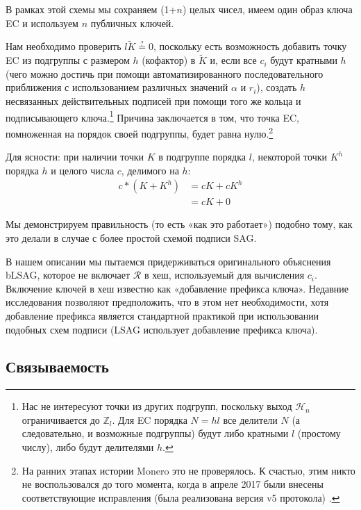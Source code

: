 В рамках этой схемы мы сохраняем (1+$n$) целых чисел, имеем один образ ключа EC и используем $n$ публичных ключей.

Нам необходимо проверить $l \tilde{K} \stackrel{?}{=} 0$, поскольку есть возможность добавить точку EC из подгруппы с размером $h$ (кофактор) в $\tilde{K}$ и, если все $c_i$ будут кратными $h$ (чего можно достичь при помощи автоматизированного последовательного приближения с использованием различных значений $\alpha$ и $r_i$), создать $h$ несвязанных действительных подписей при помощи того же кольца и подписывающего ключа.\footnote{Нас не интересуют точки из других подгрупп, поскольку выход $\mathcal{H}_n$ ограничивается до $\mathbb{Z}_l$. Для EC порядка $N = h l$ все делители $N$ (а следовательно, и возможные подгруппы) будут либо кратными $l$ (простому числу), либо будут делителями $h$.} Причина заключается в том, что точка EC, помноженная на порядок своей подгруппы, будет равна нулю.\footnote{На ранних этапах истории Monero это не проверялось. К счастью, этим никто не воспользовался до того момента, когда в апреле 2017 были внесены соответствующие исправления (была реализована версия v5 протокола) \cite{key-image-bug}.}

Для ясности: при наличии точки $K$ в подгруппе порядка $l$, некоторой точки $K^h$ порядка $h$ и целого числа $c$, делимого на $h$:
\begin{align*}
    c*(K + K^h) &= cK + cK^h\\
                &= cK + 0
\end{align*}

Мы демонстрируем правильность (то есть «как это работает») подобно тому, как это делали в случае с более простой схемой подписи SAG.

В нашем описании мы пытаемся придерживаться оригинального объяснения bLSAG, которое не включает $\mathcal{R}$ в хеш, используемый для вычисления $c_i$. Включение ключей в хеш известно как «добавление префикса ключа». Недавние исследования \cite{key-prefix-paper} позволяют предположить, что в этом нет необходимости, хотя добавление префикса является стандартной практикой при использовании подобных схем подписи (LSAG использует добавление префикса ключа).


\subsection*{Связываемость}

